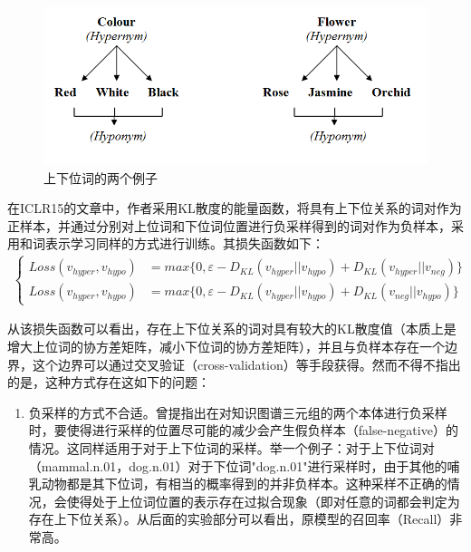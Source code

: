\documentclass[a4paper,13pt]{article}
\begin{document}
\begin{spacing}{1.5}
\begin{figure}[h]
	\includegraphics[width=\textwidth]{hypernym-hyponym.png}
	\caption{\wuhao 上下位词的两个例子}
	\centering
	\label{fig:hyper}
\end{figure}

在ICLR15的文章中，作者采用KL散度的能量函数，将具有上下位关系的词对作为正样本，并通过分别对上位词和下位词位置进行负采样得到的词对作为负样本，采用和词表示学习同样的方式进行训练。其损失函数如下：
\begin{align*}
\begin{cases}
Loss(v_{hyper}, v_{hypo}) &= max\{ 0, \varepsilon - D_{KL}(v_{hyper}||v_{hypo}) + D_{KL}(v_{hyper}||v_{neg}) \}  \\
Loss(v_{hyper}, v_{hypo}) &= max\{ 0, \varepsilon - D_{KL}(v_{hyper}||v_{hypo}) + D_{KL}(v_{neg}||v_{hypo}) \}
\end{cases}
\end{align*}

从该损失函数可以看出，存在上下位关系的词对具有较大的KL散度值（本质上是增大上位词的协方差矩阵，减小下位词的协方差矩阵），并且与负样本存在一个边界，这个边界可以通过交叉验证（cross-validation）等手段获得。然而不得不指出的是，这种方式存在这如下的问题：
\begin{enumerate}[label=\alph*)]
\item 负采样的方式不合适。\cite{he2015learning}曾提指出在对知识图谱三元组的两个本体进行负采样时，要使得进行采样的位置尽可能的减少会产生假负样本（false-negative）的情况。这同样适用于对于上下位词的采样。举一个例子：对于上下位词对（mammal.n.01，dog.n.01）对于下位词"dog.n.01"进行采样时，由于其他的哺乳动物都是其下位词，有相当的概率得到的并非负样本。这种采样不正确的情况，会使得处于上位词位置的表示存在过拟合现象（即对任意的词都会判定为存在上下位关系）。从后面的实验部分可以看出，原模型的召回率（Recall）非常高。


\end{enumerate}
\end{spacing}
\end{document}
